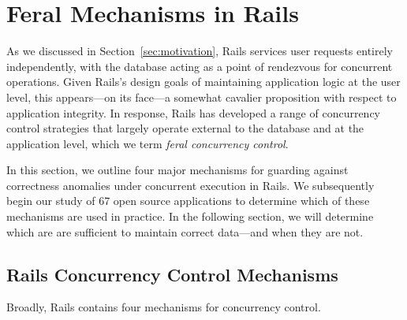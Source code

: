 
\section{Feral Mechanisms in Rails}
\label{sec:rails-cc}

As we discussed in Section~\ref{sec:motivation}, Rails services user
requests entirely independently, with the database acting as a point
of rendezvous for concurrent operations. Given Rails's design goals of
maintaining application logic at the user level, this appears---on its
face---a somewhat cavalier proposition with respect to application
integrity. In response, Rails has developed a range of
concurrency control strategies that largely operate external to the
database and at the application level, which we term \textit{feral
  concurrency control}.

In this section, we outline four major mechanisms for guarding against
correctness anomalies under concurrent execution in Rails. We
subsequently begin our study of 67 open source applications to
determine which of these mechanisms are used in practice. In the following
section, we will determine which are are sufficient to maintain
correct data---and when they are not.

\subsection{Rails Concurrency Control Mechanisms}

Broadly, Rails contains four mechanisms for concurrency control.


